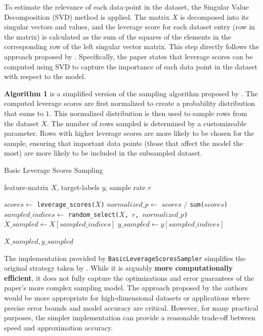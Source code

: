 \documentclass{article}
\theoremstyle{plain}
\theoremstyle{definition}
\theoremstyle{remark}
\begin{document}
To estimate the relevance of each data-point in the dataset, the Singular Value Decomposition (SVD) method is applied. The matrix $X$ is decomposed into its singular vectors and values, and the leverage score for each dataset entry (row in the matrix) is calculated as the sum of the squares of the elements in the corresponding row of the left singular vector matrix. This step directly follows the approach proposed by \citet{chow24}. Specifically, the paper states that leverage scores can be computed using SVD to capture the importance of each data point in the dataset with respect to the model.

\textbf{Algorithm 1} is a simplified version of the sampling algorithm proposed by \citet{chow24}. The computed leverage scores are first normalized to create a probability distribution that sums to $1$. This normalized distribution is then used to sample rows from the dataset $X$. The number of rows sampled is determined by a customizeable parameter. Rows with higher leverage scores are more likely to be chosen for the sample, ensuring that important data points (those that affect the model the most) are more likely to be included in the subsampled dataset.

\begin{algorithm}[tb]
	\caption{Basic Leverage Scores Sampling}
	\label{alg:example}
	\begin{algorithmic}
		 feature-matrix $X$, target-labels $y$, sample rate $r$
		
		\vspace{0.25cm}
		
		\STATE $scores \leftarrow$ \texttt{leverage\_scores($X$)}
		\STATE $normalized\_p \leftarrow$ $scores$ / \texttt{sum($scores$)}
		\STATE $sampled\_indices \leftarrow$ \texttt{random\_select($X$, $r$,  $normalized\_p$)}
		\STATE $X\_sampled \leftarrow X[sampled\_indices]$
		\STATE $y\_sampled \leftarrow y[sampled\_indices]$
		
		\vspace{0.25cm}
		
		 \texttt{$X\_sampled, y\_sampled$}
	\end{algorithmic}
\end{algorithm}


The implementation provided by \texttt{BasicLeverageScoresSampler} simplifies the original strategy taken by \citet{chow24}. While it is arguably \textbf{more computationally efficient}, it does not fully capture the optimizations and error guarantees of the paper's more complex sampling model. The approach proposed by the authors would be more appropriate for high-dimensional datasets or applications where precise error bounds and model accuracy are critical. However, for many practical purposes, the simpler implementation can provide a reasonable trade-off between speed and approximation accuracy.
\end{document}
